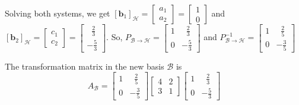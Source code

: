 \documentclass[a4paper,11pt,reqno]{amsart}
\numberwithin{equation}{section}
\begin{document}
\begin{enumerate}
\begin{center}
{{    Solving both systems, we get 
    \([\mathbf{b}_1]_{\mathcal{H}} = \begin{bmatrix} a_1 \\ a_2 \end{bmatrix} =  \begin{bmatrix} 1\\0 \end{bmatrix}\)
    and 
    \([\mathbf{b}_2]_{\mathcal{H}} = \begin{bmatrix} c_1 \\ c_2 \end{bmatrix} = \begin{bmatrix} \;\;\frac{2}{3}\\-\frac{5}{3} \end{bmatrix}\).
    So,
    \(
    P_{{\mathcal{B}} \to {\mathcal{H}}} =
    \begin{bmatrix} 1 & \;\;\frac{2}{3} \\ 0 & -\frac{5}{3} \end{bmatrix}
    \) 
    and  \(
    P^{-1}_{{\mathcal{B}} \to {\mathcal{H}}} =
    \begin{bmatrix} 1 & \;\;\frac{2}{5} \\ 0 & -\frac{3}{5} \end{bmatrix}
    \)

    \vspace{0.3cm}
    
    The transformation matrix in the new basis \( {\mathcal{B}} \) is
    \[
    A_{\mathcal{B}} = 
    \begin{bmatrix} 1 & \;\;\frac{2}{5} \\ 0 & -\frac{3}{5} \end{bmatrix}
    \begin{bmatrix} 4 & 2 \\ 3 & 1 \end{bmatrix}
    \begin{bmatrix} 1 & \;\;\frac{2}{3} \\ 0 & -\frac{5}{3} \end{bmatrix}
    \]
    
    }}
    \end{center}
\end{enumerate}
\end{document}
